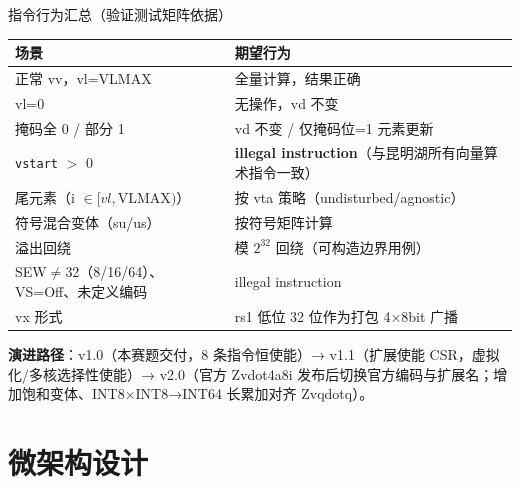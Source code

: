 \documentclass[aspectratio=169]{beamer}
\newcommand{\smalltable}[1]{\par\centering\scriptsize #1\par}
\begin{document}
\begin{frame}{指令行为汇总（验证测试矩阵依据）}
\smalltable{%
\begin{tabular}{@{}ll@{}}
\toprule
场景 & 期望行为 \\
\midrule
正常 vv，vl=VLMAX & 全量计算，结果正确 \\
vl=0 & 无操作，vd 不变 \\
掩码全 0 / 部分 1 & vd 不变 / 仅掩码位=1 元素更新 \\
\texttt{vstart} $>$ 0 & \textbf{illegal instruction}（与昆明湖所有向量算术指令一致） \\
尾元素（i $\in [vl,\text{VLMAX})$） & 按 vta 策略（undisturbed/agnostic） \\
符号混合变体（su/us） & 按符号矩阵计算 \\
溢出回绕 & 模 $2^{32}$ 回绕（可构造边界用例） \\
SEW$\neq$32（8/16/64）、VS=Off、未定义编码 & illegal instruction \\
vx 形式 & rs1 低位 32 位作为打包 4×8bit 广播 \\
\bottomrule
\end{tabular}}
\vspace{0.6em}
\textbf{演进路径}：v1.0（本赛题交付，8 条指令恒使能）→ v1.1（扩展使能 CSR，虚拟化/多核选择性使能）→ v2.0（官方 Zvdot4a8i 发布后切换官方编码与扩展名；增加饱和变体、INT8×INT8→INT64 长累加对齐 Zvqdotq）。
\end{frame}

\section{微架构设计}
\end{document}
